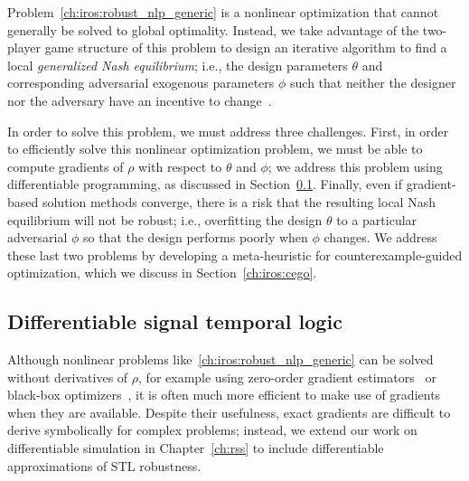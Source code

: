 Problem~\eqref{ch:iros:robust_nlp_generic} is a nonlinear optimization that cannot generally be solved to global optimality. Instead, we take advantage of the two-player game structure of this problem to design an iterative algorithm to find a local \textit{generalized Nash equilibrium}; i.e., the design parameters $\theta$ and corresponding adversarial exogenous parameters $\phi$ such that neither the designer nor the adversary have an incentive to change~\cite{facchineiGeneralizedNashEquilibrium2007}.

In order to solve this problem, we must address three challenges. First, in order to efficiently solve this nonlinear optimization problem, we must be able to compute gradients of $\rho$ with respect to $\theta$ and $\phi$; we address this problem using differentiable programming, as discussed in Section~\ref{ch:iros:diffstl}. 
%
Finally, even if gradient-based solution methods converge, there is a risk that the resulting local Nash equilibrium will not be robust; i.e., overfitting the design $\theta$ to a particular adversarial $\phi$ so that the design performs poorly when $\phi$ changes.
%
We address these last two problems by developing a meta-heuristic for counterexample-guided optimization, which we discuss in Section~\ref{ch:iros:cego}.

\subsection{Differentiable signal temporal logic}\label{ch:iros:diffstl}

Although nonlinear problems like~\eqref{ch:iros:robust_nlp_generic} can be solved without derivatives of $\rho$, for example using zero-order gradient estimators~\cite{suh2021_bundled_gradients} or black-box optimizers~\cite{corsoSurveyAlgorithmsBlackBox2021}, it is often much more efficient to make use of gradients when they are available. Despite their usefulness, exact gradients are difficult to derive symbolically for complex problems; instead, we extend our work on differentiable simulation in Chapter~\ref{ch:rss} to include differentiable approximations of STL robustness.


